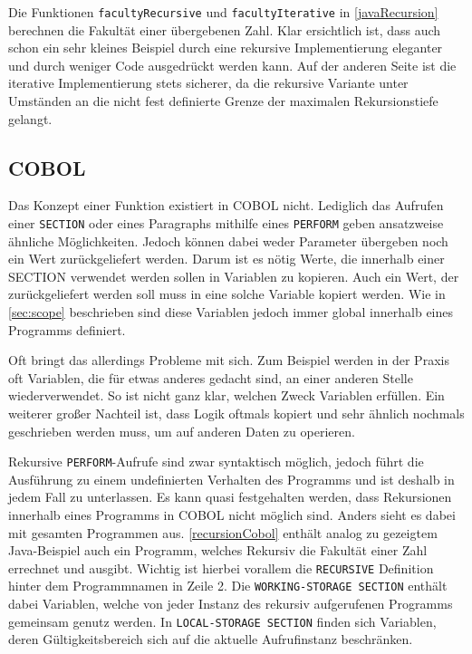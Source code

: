 Die Funktionen \texttt{facultyRecursive} und \texttt{facultyIterative} in \autoref{javaRecursion} berechnen  die Fakultät einer übergebenen Zahl. Klar ersichtlich ist, dass auch schon ein sehr kleines Beispiel durch eine rekursive Implementierung eleganter und durch weniger Code ausgedrückt werden kann. Auf der anderen Seite ist die iterative Implementierung stets sicherer, da die rekursive Variante unter Umständen an die nicht fest definierte Grenze der maximalen Rekursionstiefe gelangt.

\subsection*{COBOL}
Das Konzept einer Funktion existiert in COBOL nicht. Lediglich das Aufrufen einer \texttt{SECTION} oder eines Paragraphs mithilfe eines \texttt{PERFORM} geben ansatzweise ähnliche Möglichkeiten. Jedoch können dabei weder Parameter übergeben noch ein Wert zurückgeliefert werden. Darum ist es nötig Werte, die innerhalb einer SECTION verwendet werden sollen in Variablen zu kopieren. Auch ein Wert, der zurückgeliefert werden soll muss in eine solche Variable kopiert werden. Wie in \autoref{sec:scope} beschrieben sind diese Variablen jedoch immer global innerhalb eines Programms definiert.

Oft bringt das allerdings Probleme mit sich. Zum Beispiel werden in der Praxis oft Variablen, die für etwas anderes gedacht sind, an einer anderen Stelle wiederverwendet. So ist nicht ganz klar, welchen Zweck Variablen erfüllen. Ein weiterer großer Nachteil ist, dass Logik oftmals kopiert und sehr ähnlich nochmals geschrieben werden muss, um auf anderen Daten zu operieren.

Rekursive \texttt{PERFORM}-Aufrufe sind zwar syntaktisch möglich, jedoch führt die Ausführung zu einem undefinierten Verhalten des Programms und ist deshalb in jedem Fall zu unterlassen. Es kann quasi festgehalten werden, dass Rekursionen innerhalb eines Programms in COBOL nicht möglich sind. Anders sieht es dabei mit gesamten Programmen aus.
\autoref{recursionCobol} enthält analog zu gezeigtem Java-Beispiel auch ein Programm, welches Rekursiv die Fakultät einer Zahl errechnet und ausgibt. Wichtig ist hierbei vorallem die \texttt{RECURSIVE} Definition hinter dem Programmnamen in Zeile 2. Die \texttt{WORKING-STORAGE SECTION} enthält dabei Variablen, welche von jeder Instanz des rekursiv aufgerufenen Programms gemeinsam genutz werden. In \texttt{LOCAL-STORAGE SECTION} finden sich Variablen, deren Gültigkeitsbereich sich auf die aktuelle Aufrufinstanz beschränken.